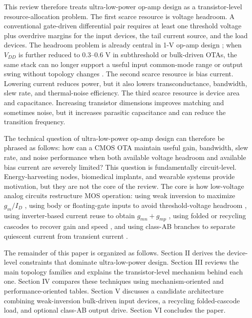 \documentclass[conference,a4paper]{IEEEtran}
\begin{document}
This review therefore treats ultra-low-power op-amp design as a transistor-level resource-allocation problem. The first scarce resource is voltage headroom. A conventional gate-driven differential pair requires at least one threshold voltage plus overdrive margins for the input devices, the tail current source, and the load devices. The headroom problem is already central in 1-V op-amp design \cite{blalock1998onevolt}; when $V_{DD}$ is further reduced to 0.3--0.6 V in subthreshold or bulk-driven OTAs, the same stack can no longer support a useful input common-mode range or output swing without topology changes \cite{chatterjee2005halfvolt,kulej2020classab}. The second scarce resource is bias current. Lowering current reduces power, but it also lowers transconductance, bandwidth, slew rate, and thermal-noise efficiency. The third scarce resource is device area and capacitance. Increasing transistor dimensions improves matching and sometimes noise, but it increases parasitic capacitance and can reduce the transition frequency.

The technical question of ultra-low-power op-amp design can therefore be phrased as follows: how can a CMOS OTA maintain useful gain, bandwidth, slew rate, and noise performance when both available voltage headroom and available bias current are severely limited? This question is fundamentally circuit-level. Energy-harvesting nodes, biomedical implants, and wearable systems provide motivation, but they are not the core of the review. The core is how low-voltage analog circuits restructure MOS operation: using weak inversion to maximize $g_m/I_D$ \cite{vittoz1977weakinversion,silveira1996gmid}, using body or floating-gate inputs to avoid threshold-voltage headroom \cite{chatterjee2005halfvolt,ramirez2004qfg}, using inverter-based current reuse to obtain $g_{mn}+g_{mp}$ \cite{nauta1992transconductor}, using folded or recycling cascodes to recover gain and speed \cite{assaad2009rfc}, and using class-AB branches to separate quiescent current from transient current \cite{kulej2020classab}.

The remainder of this paper is organized as follows. Section II derives the device-level constraints that dominate ultra-low-power design. Section III reviews the main topology families and explains the transistor-level mechanism behind each one. Section IV compares these techniques using mechanism-oriented and performance-oriented tables. Section V discusses a candidate architecture combining weak-inversion bulk-driven input devices, a recycling folded-cascode load, and optional class-AB output drive. Section VI concludes the paper.
\end{document}
